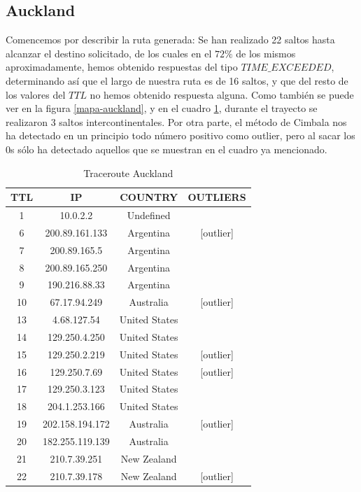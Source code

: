 \subsection{Auckland}

Comencemos por describir la ruta generada:
Se han realizado 22 saltos hasta alcanzar el destino solicitado, de los cuales en el $72 \% $ de los mismos aproximadamente, hemos obtenido respuestas del tipo $TIME\_EXCEEDED$, determinando así que el largo de nuestra ruta es de 16 saltos, y que del resto de los valores del $TTL$ no hemos obtenido respuesta alguna. Como también se puede ver en la figura \ref{mapa-auckland}, y en el cuadro \ref{tabla-auckland}, durante el trayecto se realizaron 3 saltos intercontinentales. Por otra parte, el método de Cimbala nos ha detectado en un principio todo número positivo como outlier, pero al sacar los 0s sólo ha detectado aquellos que se muestran en el cuadro ya mencionado.

\begin{table}[!htbp]
\centering
\caption{Traceroute Auckland}
\label{tabla-auckland}
\begin{tabular}{|c|c|c|c|}
\hline
\textbf{TTL} & \textbf{IP}    & \textbf{COUNTRY} & \textbf{OUTLIERS} \\ \hline
1   & 10.0.2.2        & Undefined     &               \\ \hline
6   & 200.89.161.133  & Argentina     & {[}outlier{]} \\ \hline
7   & 200.89.165.5    & Argentina     &               \\ \hline
8   & 200.89.165.250  & Argentina     &               \\ \hline
9   & 190.216.88.33   & Argentina     &               \\ \hline
10  & 67.17.94.249    & Australia     & {[}outlier{]} \\ \hline
13  & 4.68.127.54     & United States &               \\ \hline
14  & 129.250.4.250   & United States &               \\ \hline
15  & 129.250.2.219   & United States & {[}outlier{]} \\ \hline
16  & 129.250.7.69    & United States & {[}outlier{]} \\ \hline
17  & 129.250.3.123   & United States &               \\ \hline
18  & 204.1.253.166   & United States &               \\ \hline
19  & 202.158.194.172 & Australia     & {[}outlier{]} \\ \hline
20  & 182.255.119.139 & Australia     &               \\ \hline
21  & 210.7.39.251    & New Zealand   &               \\ \hline
22  & 210.7.39.178    & New Zealand   & {[}outlier{]} \\ \hline
\end{tabular}
\end{table}

